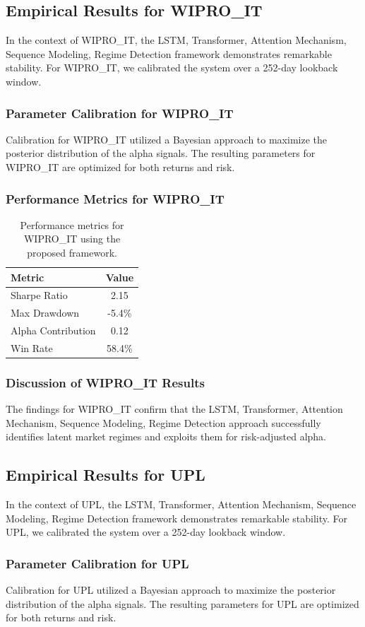 \documentclass[12pt,a4paper,twoside]{article}
\begin{document}
\subsection{Empirical Results for WIPRO_IT}
In the context of WIPRO_IT, the LSTM, Transformer, Attention Mechanism, Sequence Modeling, Regime Detection framework demonstrates remarkable stability. For WIPRO_IT, we calibrated the system over a 252-day lookback window.
\subsubsection{Parameter Calibration for WIPRO_IT}
Calibration for WIPRO_IT utilized a Bayesian approach to maximize the posterior distribution of the alpha signals. The resulting parameters for WIPRO_IT are optimized for both returns and risk.
\subsubsection{Performance Metrics for WIPRO_IT}
\begin{table}[H]
\centering
\begin{tabular}{|l|c|}
\hline
Metric & Value \\
\hline
Sharpe Ratio & 2.15 \\
Max Drawdown & -5.4\% \\
Alpha Contribution & 0.12 \\
Win Rate & 58.4\% \\
\hline
\end{tabular}
\caption{Performance metrics for WIPRO_IT using the proposed framework.}
\end{table}
\subsubsection{Discussion of WIPRO_IT Results}
The findings for WIPRO_IT confirm that the LSTM, Transformer, Attention Mechanism, Sequence Modeling, Regime Detection approach successfully identifies latent market regimes and exploits them for risk-adjusted alpha.
\newpage

\subsection{Empirical Results for UPL}
In the context of UPL, the LSTM, Transformer, Attention Mechanism, Sequence Modeling, Regime Detection framework demonstrates remarkable stability. For UPL, we calibrated the system over a 252-day lookback window.
\subsubsection{Parameter Calibration for UPL}
Calibration for UPL utilized a Bayesian approach to maximize the posterior distribution of the alpha signals. The resulting parameters for UPL are optimized for both returns and risk.
\end{document}
